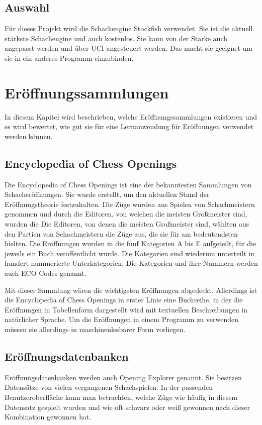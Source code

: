 \subsection{Auswahl}
Für dieses Projekt wird die Schachengine Stockfish verwendet. Sie ist die aktuell stärkste Schachengine und auch kostenlos. Sie kann von der Stärke auch angepasst werden und über \ac{UCI} angesteuert werden. Das macht sie geeignet um sie in ein anderes Programm einzubinden.

\section{Eröffnungssammlungen}
In diesem Kapitel wird beschrieben, welche Eröffnungssammlungen existieren und es wird bewertet, wie gut sie für eine Lernanwendung für Eröffnungen verwendet werden können.

\subsection{Encyclopedia of Chess Openings}
Die Encyclopedia of Chess Openings ist eine der bekanntesten Sammlungen von Schacheröffnungen. Sie wurde erstellt, um den aktuellen Stand der Eröffnungstheorie festzuhalten. Die Züge wurden aus Spielen von Schachmeistern genommen und durch die Editoren, von welchen die meisten Großmeister sind, wurden die
Die Editoren, von denen die meisten Großmeister sind, wählten aus den Partien von Schachmeistern die Züge aus, die sie für am bedeutendsten hielten. Die Eröffnungen wurden in die fünf Kategorien A bis E aufgeteilt, für die jeweils ein Buch veröffentlicht wurde. Die Kategorien sind wiederum unterteilt in hundert nummerierte Unterkategorien. Die Kategorien und ihre Nummern werden auch ECO Codes genannt.
\cite{wikipedia_foundation_inc_encyclopaedia_2024}

Mit dieser Sammlung wären die wichtigsten Eröffnungen abgedeckt. Allerdings ist die Encyclopedia of Chess Openings in erster Linie eine Buchreihe, in der die Eröffnungen in Tabellenform dargestellt wird mit textuellen Beschreibungen in natürlicher Sprache. Um die Eröffnungen in einem Programm zu verwenden müssen sie allerdings in maschinenlesbarer Form vorliegen.

\subsection{Eröffnungsdatenbanken}
Eröffnungsdatenbanken werden auch Opening Explorer genannt. Sie besitzen Datensätze von vielen vergangenen Schachspielen. In der passenden Benutzeroberfläche kann man betrachten, welche Züge wie häufig in diesem Datensatz gespielt wurden und wie oft schwarz oder weiß gewonnen nach dieser Kombination gewonnen hat. 

